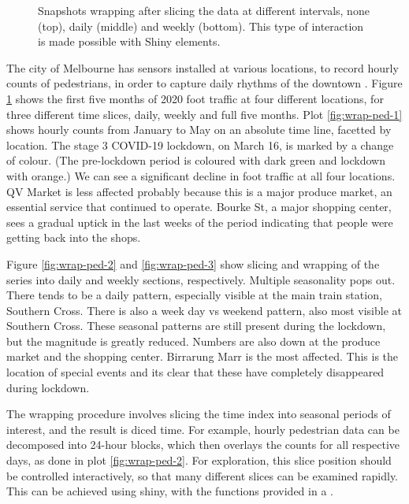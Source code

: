 \begin{Schunk}
\begin{figure}
{}

\caption[Snapshots wrapping after slicing the  data at different intervals, none (top), daily (middle) and weekly (bottom)]{Snapshots wrapping after slicing the  data at different intervals, none (top), daily (middle) and weekly (bottom). This type of interaction is made possible with Shiny elements.}\label{fig:wrap-ped}
\end{figure}
\end{Schunk}

The city of Melbourne has sensors installed at various locations, to
record hourly counts of pedestrians, in order to capture daily rhythms
of the downtown \citep{ped}. Figure \ref{fig:wrap-ped} shows the first
five months of 2020 foot traffic at four different locations, for three
different time slices, daily, weekly and full five months. Plot
\ref{fig:wrap-ped-1} shows hourly counts from January to May on an
absolute time line, facetted by location. The stage 3 COVID-19 lockdown,
on March 16, is marked by a change of colour. (The pre-lockdown period
is coloured with dark green and lockdown with orange.) We can see a
significant decline in foot traffic at all four locations. QV Market is
less affected probably because this is a major produce market, an
essential service that continued to operate. Bourke St, a major shopping
center, sees a gradual uptick in the last weeks of the period indicating
that people were getting back into the shops.

Figure \ref{fig:wrap-ped-2} and \ref{fig:wrap-ped-3} show slicing and
wrapping of the series into daily and weekly sections, respectively.
Multiple seasonality pops out. There tends to be a daily pattern,
especially visible at the main train station, Southern Cross. There is
also a week day vs weekend pattern, also most visible at Southern Cross.
These seasonal patterns are still present during the lockdown, but the
magnitude is greatly reduced. Numbers are also down at the produce
market and the shopping center. Birrarung Marr is the most affected.
This is the location of special events and its clear that these have
completely disappeared during lockdown.

The wrapping procedure involves slicing the time index into seasonal
periods of interest, and the result is diced time. For example, hourly
pedestrian data can be decomposed into 24-hour blocks, which then
overlays the counts for all respective days, as done in plot
\ref{fig:wrap-ped-2}. For exploration, this slice position should be
controlled interactively, so that many different slices can be examined
rapidly. This can be achieved using shiny, with the functions provided
in a .

